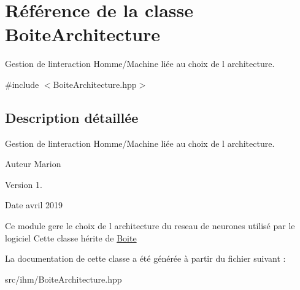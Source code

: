 \hypertarget{class_boite_architecture}{}\section{Référence de la classe Boite\+Architecture}
\label{class_boite_architecture}


Gestion de l\textquotesingle{}interaction Homme/\+Machine liée au choix de l architecture.  




{\ttfamily \#include $<$Boite\+Architecture.\+hpp$>$}



\subsection{Description détaillée}
Gestion de l\textquotesingle{}interaction Homme/\+Machine liée au choix de l architecture. 

\begin{DoxyAuthor}{Auteur}
Marion 
\end{DoxyAuthor}
\begin{DoxyVersion}{Version}
1. 
\end{DoxyVersion}
\begin{DoxyDate}{Date}
avril 2019
\end{DoxyDate}
Ce module gere le choix de l architecture du reseau de neurones utilisé par le logiciel Cette classe hérite de \hyperlink{class_boite}{Boite} 

La documentation de cette classe a été générée à partir du fichier suivant \+:\begin{DoxyCompactItemize}
\item 
src/ihm/Boite\+Architecture.\+hpp\end{DoxyCompactItemize}

